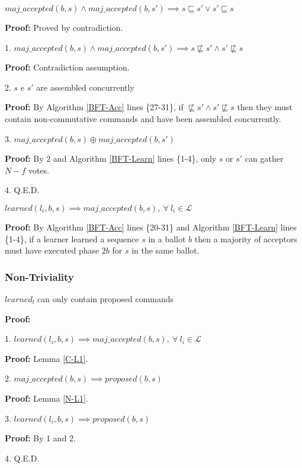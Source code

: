 \begin{lemma}
$maj\_accepted(b,s) \land maj\_accepted(b,s') \implies s \sqsubseteq s' \lor s' \sqsubseteq s$ \label{C-L3} \par
\end{lemma}
\textbf{Proof:} Proved by contradiction.\par
1. $maj\_accepted(b,s) \land maj\_accepted(b,s') \implies s \not\sqsubseteq s' \land s' \not\sqsubseteq s$ \par
\indent\indent\textbf{Proof:} Contradiction assumption.\par
2. $s$ e $s'$ are assembled concurrently \par
\indent\indent\textbf{Proof:} By Algorithm \ref{BFT-Acc} lines \{27-31\}, if $\not\sqsubseteq s' \land s' \not\sqsubseteq s$ then they must contain non-commutative commands and have been assembled concurrently. \par
3. $maj\_accepted(b,s) \oplus maj\_accepted(b,s')$ \par
\indent\indent\textbf{Proof:} By 2 and Algorithm \ref{BFT-Learn} lines \{1-4\}, only $s$ or $s'$ can gather $N-f$ votes.  \par
4. Q.E.D. \par

\begin{lemma}
$learned(l_i,b,s) \implies maj\_accepted(b,s),\ \forall\ l_i \in \mathcal{L}$ \label{C-L1} \par
\end{lemma} 
\textbf{Proof:} By Algorithm \ref{BFT-Acc} lines \{20-31\} and Algorithm \ref{BFT-Learn} lines \{1-4\}, if a learner learned a sequence $s$ in a ballot $b$ then a majority of acceptors must have executed phase $2b$ for $s$ in the same ballot.

\subsubsection{Non-Triviality}
\begin{theorem}
$learned_l$ can only contain proposed commands \label{N-T1} \par
\end{theorem} 
\textbf{Proof:} \par
1. $learned(l_i,b,s) \implies maj\_accepted(b,s),\ \forall\ l_i \in \mathcal{L}$ \par
\indent\indent\textbf{Proof:} Lemma \ref{C-L1}. \par
2. $maj\_accepted(b,s) \implies proposed(b,s)$ \par
\indent\indent\textbf{Proof:} Lemma \ref{N-L1}.\par
3. $learned(l_i,b,s) \implies proposed(b,s)$ \par
\indent\indent\textbf{Proof:} By 1 and 2. \par
4. Q.E.D. \par

